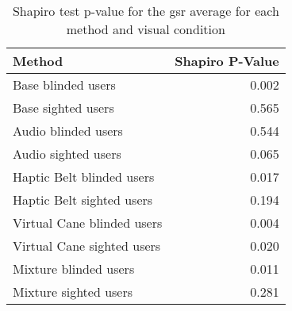 
\begin{table}[!htb]
\centering
\caption{Shapiro test p-value for the gsr average for each method and visual condition}
\label{tab:shapiro_gsr}
\begin{tabular}{lr}
\toprule
                    Method &  Shapiro P-Value \\
\midrule
        Base blinded users &            0.002 \\
        Base sighted users &            0.565 \\
       Audio blinded users &            0.544 \\
       Audio sighted users &            0.065 \\
 Haptic Belt blinded users &            0.017 \\
 Haptic Belt sighted users &            0.194 \\
Virtual Cane blinded users &            0.004 \\
Virtual Cane sighted users &            0.020 \\
     Mixture blinded users &            0.011 \\
     Mixture sighted users &            0.281 \\
\bottomrule
\end{tabular}
\end{table}

